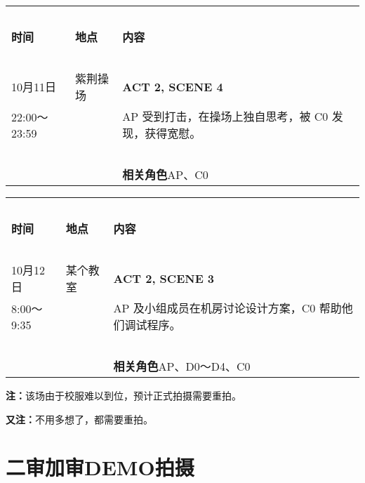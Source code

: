 \documentclass[10pt, a5paper, oneside]{memoir}
\begin{document}
\begin{table}[!ht]
    \raggedright
    \begin{tabular}{p{}p{}p{}}
        \toprule
        ~ & & \\[-0.7em]
        \textbf{时间} & \textbf{地点} & \textbf{内容} \\[0.3em]
        \midrule
        ~ & & \\[-0.7em]
        10月11日        & 紫荆操场 & \textbf{ACT 2, SCENE 4} \\[0.3em]
        22:00～23:59    & ~ & 
            AP 受到打击，在操场上独自思考，被 C0 发现，获得宽慰。
        \\
        ~ & & \\[-0.7em]
        ~ & ~ & \textbf{相关角色\quad}AP、C0 \\[0.3em]
        \bottomrule
    \end{tabular}
\end{table}

\begin{table}[!ht]
    \raggedright
    \begin{tabular}{p{}p{}p{}}
        \toprule
        ~ & & \\[-0.7em]
        \textbf{时间} & \textbf{地点} & \textbf{内容} \\[0.3em]
        \midrule
        ~ & & \\[-0.7em]
        10月12日        & 某个教室 & \textbf{ACT 2, SCENE 3} \\[0.3em]
        8:00～9:35      & ~ & 
            AP 及小组成员在机房讨论设计方案，C0 帮助他们调试程序。
        \\
        ~ & & \\[-0.7em]
        ~ & ~ & \textbf{相关角色\quad}AP、D0～D4、C0 \\[0.3em]
        \bottomrule
    \end{tabular}
\end{table}
{   \vspace{-0.7\baselineskip}
    \kai \small
    \textbf{注：}该场由于校服难以到位，预计正式拍摄需要重拍。
}

{   \vspace{-0.5\baselineskip}
    \kai \small
    \textbf{又注：}不用多想了，都需要重拍。
}

\clearpage

\section*{二审加审DEMO拍摄}
\end{document}

